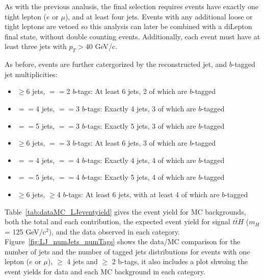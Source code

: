 \par As with the previous analusis, the final selection requires
events have exactly one tight lepton ($e$ or $\mu$), and at least four
jets. Events with any additional loose or tight leptons are vetoed so
this analysis can later be combined with a diLepton final state,
without double counting events. Additionally, each event must have at
least three jets with $p_{T} > 40$ GeV/c. 

\par As before, events are further catergorized by the reconstructed jet, and
$b$-tagged jet multiplicities:

\begin{itemize}
  \item $\ge$6 jets,  $==$2 $b$-tags: At least 6 jets, 2 of which are $b$-tagged 
  \item $==$4 jets, $==$3 $b$-tags: Exactly 4 jets, 3 of which are $b$-tagged 
  \item $==$5 jets, $==$3 $b$-tags: Exactly 5 jets, 3 of which are $b$-tagged 
  \item $\ge$6 jets, $==$3 $b$-tags: At least 6 jets, 3 of which are $b$-tagged 
  \item $==$4 jets, $==$4 $b$-tags: Exactly 4 jets, 4 of which are $b$-tagged 
  \item $==$5 jets, $==$4 $b$-tags: Exactly 5 jets, 4 of which are $b$-tagged 
  \item $\ge$6 jets, $\ge$4 $b$-tags: At least 6 jets, with at least 4 of which are $b$-tagged 
\end{itemize}


\par Table~\ref{tab:dataMC_LJeventyield} gives the event yield for MC
backgrounds, both the total and each contribution, the expected event
yield for signal \(t\bar{t}H\) (\(m_{H}\) = 125 GeV/c$^2$), and the
data observed in each category. Figure~\ref{fig:LJ_numJets_numTags}
shows the data/MC comparison for the number of jets and the number of
tagged jets distributions for events with one lepton (\(e\) or
\(\mu\)), \(\ge\) 4 jets and \(\ge\) 2 b-tags, it also includes a plot
shwoing the event yields for data and each MC background in each
category. 

